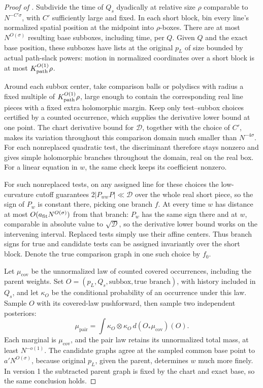 \begin{proof}[Proof of ]
Subdivide the time of \(Q_s\) dyadically at relative size \(\rho\)
comparable to \(N^{-C'\sigma}\), with \(C'\) sufficiently large and
fixed.  In each short block, bin every line's normalized spatial
position at the midpoint into \(\rho\)-boxes.  There are at most
\(N^{O(\sigma)}\) resulting base subboxes, including time, per \(Q\).
Given \(Q\) and the exact base position, these subboxes have lists
at the original \(p_L\) of size bounded by actual path-slack powers:
motion in normalized coordinates over a short block is at most
\(K_{\rm path}^{O(1)}\rho\).

Around each subbox center, take comparison balls or polydiscs with
radius a fixed multiple of \(K_{\rm path}^{O(1)}\rho\), large enough
to contain the corresponding real line pieces with a fixed extra
holomorphic margin.  Keep only test--subbox choices certified by a
counted occurrence, which supplies the derivative lower bound at one
point.  The chart derivative bound for \(\mathcal D\), together with
the choice of \(C'\), makes its variation throughout this comparison
domain much smaller than \(N^{-4\sigma}\).  For each nonreplaced
quadratic test, the discriminant therefore stays nonzero and gives
simple holomorphic branches throughout the domain, real on the real
box.  For a linear equation in \(w\), the same check keeps its
coefficient nonzero.

For such nonreplaced tests, on any assigned line for these choices the low-curvature cutoff guarantees \(2|P_{ww}P|\ll\mathcal D\) over the whole real short piece, so the sign of \(P_w\) is constant there, picking one branch \(f\). At every time \(w\) has distance at most \(O(a_{\rm fit}N^{O(\sigma)})\) from that branch: \(P_w\) has the same sign there and at \(w\), comparable in absolute value to \(\sqrt{\mathcal D}\), so the derivative lower bound works on the intervening interval. Replaced tests simply use their affine centers. Thus branch signs for true and candidate tests can be assigned invariantly over the short block. Denote the true comparison graph in one such choice by \(f_0\).

Let \(\mu_{\mathrm{cov}}\) be the unnormalized law of counted covered
occurrences, including the parent weights.  Set
\(O=(p_L,Q_s,\text{subbox},\text{true branch})\), with history
included in \(Q_s\), and let \(\kappa_O\) be the conditional
probability of an occurrence under this law.  Sample \(O\) with
its covered-law pushforward, then sample two independent posteriors:
\begin{equation}
 \mu_{\mathrm{pair}}
   =\int \kappa_O\otimes\kappa_O\,d(O_*\mu_{\mathrm{cov}})(O).
 \label{a03:covered-pair-law}
\end{equation}
Each marginal is \(\mu_{\mathrm{cov}}\), and the pair law retains
its unnormalized total mass, at least \(N^{-o(1)}\).
The candidate graphs agree at the sampled common base point to
\(a'N^{O(\sigma)}\), because original \(p_L\), given the parent,
determines \(w\) much more finely.  In version 1 the subtracted
parent graph is fixed by the chart and exact base, so the same
conclusion holds.


\end{proof}
